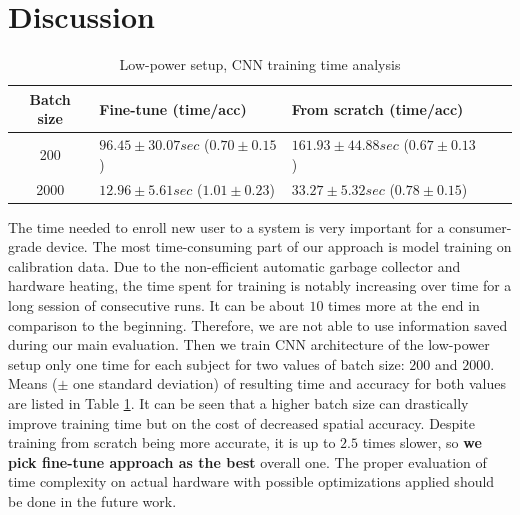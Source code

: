 \section{Discussion}\label{sec:disc}

\begin{table}[h]
    \centering
    \caption{Low-power setup, CNN training time analysis}
    \begin{adjustbox}{max width=\columnwidth}
	\begin{tabular}{>{\columncolor[rgb]{0.93,0.95,0.98}}cllll}
    \toprule
    \rowcolor[rgb]{0.93,0.95,0.98}
        \color[rgb]{0.07,0.13,0.47}\textbf{Batch size} &
        \color[rgb]{0.07,0.13,0.47}\textbf{Fine-tune (time/acc)} &
        \color[rgb]{0.07,0.13,0.47}\textbf{From scratch (time/acc)} \\
    \midrule
    200           & $96.45\pm{30.07} sec$ ($0.70\pm{0.15}$\textdegree{}) & $161.93\pm{44.88} sec$ ($0.67\pm{0.13}$\textdegree{}) \\
    \midrule
    2000           & $12.96\pm{5.61} sec$ ($1.01\pm{0.23}$\textdegree{}) & $33.27\pm{5.32} sec$ ($0.78\pm{0.15}$\textdegree{}) \\
    \bottomrule
    \end{tabular}
	\end{adjustbox}
\label{tab:tab_time_lp}
\end{table}

The time needed to enroll new user to a system is very important for a consumer-grade device. The most time-consuming part of our approach is model training on calibration data. Due to the non-efficient automatic garbage collector and hardware heating, the time spent for training is notably increasing over time for a long session of consecutive runs. It can be about $10$ times more at the end in comparison to the beginning. Therefore, we are not able to use information saved during our main evaluation. Then we train CNN architecture of the low-power setup only one time for each subject for two values of batch size: $200$ and $2000$. Means ($\pm{}$ one standard deviation) of resulting time and accuracy for both values are listed in Table \ref{tab:tab_time_lp}. It can be seen that a higher batch size can drastically improve training time but on the cost of decreased spatial accuracy. Despite training from scratch being more accurate, it is up to $2.5$ times slower, so \textbf{we pick fine-tune approach as the best} overall one. The proper evaluation of time complexity on actual hardware with possible optimizations applied should be done in the future work. 

